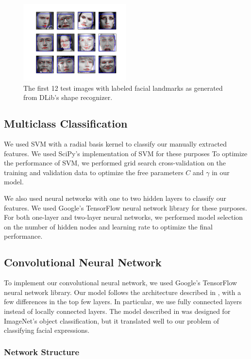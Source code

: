 \documentclass[10pt, twocolumn, twoside]{article}
\begin{document}
\begin{figure}[htb]
\centering
\includegraphics[width=0.5\textwidth]{landmarks}
\caption{\label{fig:landmarks} The first 12 test images with labeled facial landmarks
as generated from DLib's shape recognizer.}
\end{figure}

\subsection{Multiclass Classification}

We used SVM with a radial basis kernel to classify our manually
extracted features. We used SciPy's implementation of SVM for these purposes
To optimize the performance of SVM, we performed grid
search cross-validation on the training and validation data to optimize the
free parameters $C$ and $\gamma$ in our model.

We also used neural networks with one to two hidden layers to classify
our features. We used Google's TensorFlow neural network library for these
purposes. For both one-layer and two-layer neural networks, we performed 
model selection on the number of hidden nodes and learning rate to optimize
the final performance.

\subsection{Convolutional Neural Network}

To implement our convolutional neural network, we used Google's TensorFlow neural network library.
Our model follows the architecture described in \cite{Krizhevsky}, with a few differences in the top few layers.
In particular, we use fully connected layers instead of locally connected layers. The model described in
\cite{Krizhevsky} was designed for ImageNet's object classification, but it translated well to our problem of classifying facial expressions.

\subsubsection{Network Structure}
\end{document}
